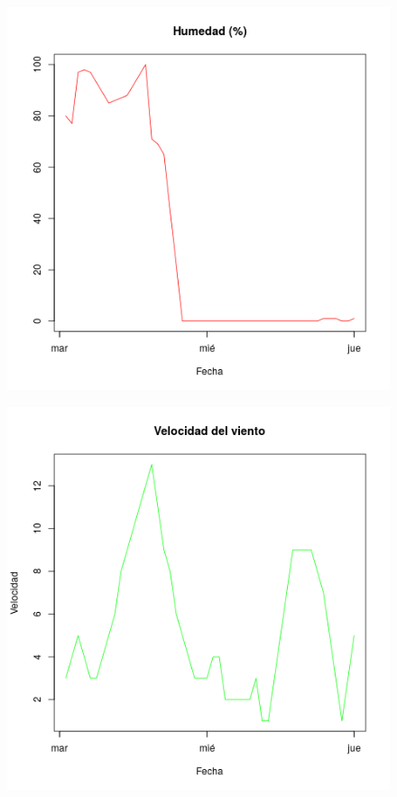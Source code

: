 \documentclass{article}
\begin{document}
\begin{figure}[htb]
\begin{center}
   \includegraphics[scale=0.4]{humedad.png}
\end{center}
\end{figure}

\begin{figure}[htb]
\begin{center}
   \includegraphics[scale=0.8]{viento.png}
\end{center}
\end{figure}
\end{document}
